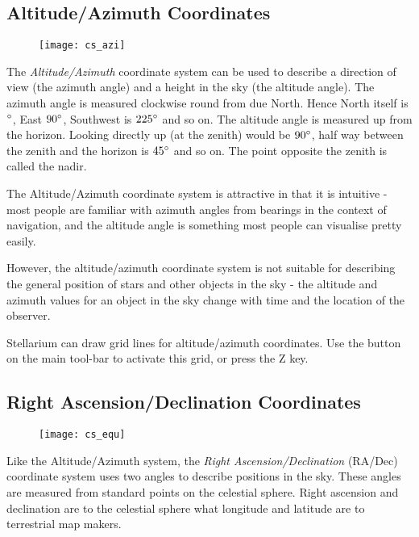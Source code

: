 \subsection{Altitude/Azimuth
Coordinates}\label{altitudeazimuth-coordinates}

\begin{figure}[h]
\centering\texttt{[image: cs\_azi]}
\end{figure}

The \emph{Altitude/Azimuth} coordinate system can be used to describe a
direction of view (the azimuth angle) and a height in the sky (the
altitude angle). The azimuth angle is measured clockwise round from due
North. Hence North itself is $\degree$, East $90\degree$, Southwest is $225\degree$ and so on.
The altitude angle is measured up from the horizon. Looking directly up
(at the zenith) would be $90\degree$, half way between the zenith and the
horizon is $45\degree$ and so on. The point opposite the zenith is called the
nadir.

The Altitude/Azimuth coordinate system is attractive in that it is
intuitive - most people are familiar with azimuth angles from bearings
in the context of navigation, and the altitude angle is something most
people can visualise pretty easily.

However, the altitude/azimuth coordinate system is not suitable for
describing the general position of stars and other objects in the sky -
the altitude and azimuth values for an object in the sky change with
time and the location of the observer.

Stellarium can draw grid lines for altitude/azimuth coordinates. Use the
button on the main tool-bar to activate this grid, or press the Z key.

\subsection{Right Ascension/Declination Coordinates}
\label{right-ascensiondeclination-coordinates}

\begin{figure}[h]
\centering\texttt{[image: cs\_equ]}
\end{figure}

Like the Altitude/Azimuth system, the \emph{Right Ascension/Declination}
(RA/Dec) coordinate system uses two angles to describe positions in the
sky. These angles are measured from standard points on the celestial
sphere. Right ascension and declination are to the celestial sphere what
longitude and latitude are to terrestrial map makers.

